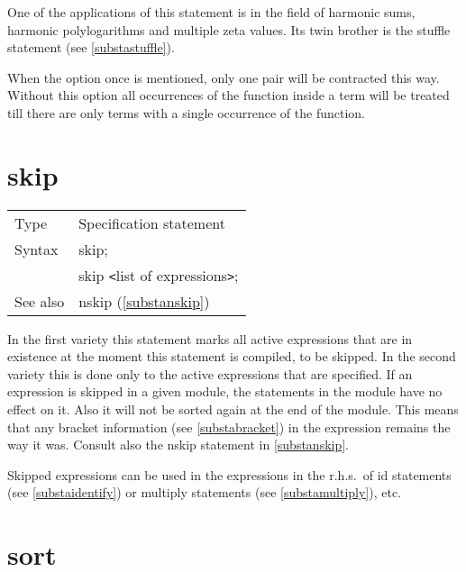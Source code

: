 One of the applications of this statement is in the field of harmonic 
sums, 
harmonic polylogarithms and multiple zeta 
values. Its twin brother is the 
stuffle statement (see \ref{substastuffle}).

When the option once is mentioned, only one pair will be contracted this 
way. Without this option all occurrences of the function inside a term will 
be treated till there are only terms with a single occurrence of the 
function.
\vspace{10mm}
%

\section{skip}
\label{substaskip}

\noindent \begin{tabular}{ll}
Type & Specification statement\\
Syntax & skip; \\
       & skip {\tt<}list of expressions{\tt>};
\\ See also & nskip (\ref{substanskip})
\end{tabular} \vspace{4mm}

\noindent In the first variety this statement marks all 
active expressions that are in existence at the moment this 
statement is compiled, to be skipped. In the second variety this is done 
only to the active expressions that are specified. If an expression is 
skipped in a given module, the statements in the module have no effect on 
it. Also it will not be sorted again at the end of the module. 
This means that any bracket information (see 
\ref{substabracket}) in the expression remains the way it was. Consult also 
the nskip statement in \ref{substanskip}. \vspace{4mm}

\noindent Skipped expressions can be used in the expressions in the r.h.s.\ 
of id statements (see \ref{substaidentify}) or 
multiply statements (see \ref{substamultiply}), etc. 
\vspace{10mm}


\section{sort}
\label{substasort}

